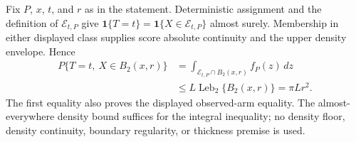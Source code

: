 Fix \(P\), \(x\), \(t\), and \(r\) as in the statement.  Deterministic
assignment and the definition of \(\mathcal E_{t,P}\) give
\(\mathbf1\{T=t\}=\mathbf1\{X\in\mathcal E_{t,P}\}\) almost surely.
Membership in either displayed class supplies score absolute continuity and
the upper density envelope.  Hence
\[
\begin{aligned}
 P\{T=t,\ X\in B_2(x,r)\}
 &=\int_{\mathcal E_{t,P}\cap B_2(x,r)}f_P(z)\,dz\\
 &\leq L\operatorname{Leb}_2\{B_2(x,r)\}
 =\pi Lr^2.
\end{aligned}
\]
The first equality also proves the displayed observed-arm equality.  The
almost-everywhere density bound suffices for the integral inequality; no density
floor, density continuity, boundary regularity, or thickness premise is used.